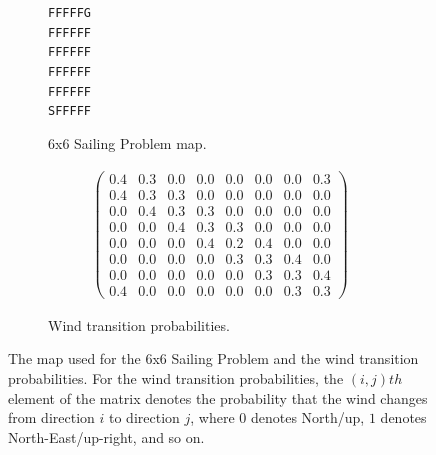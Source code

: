 \documentclass{article}
\theoremstyle{plain}
\begin{document}
\begin{appendices}
        \begin{figure}
             \centering
             \begin{subfigure}[b]{0.49\textwidth}
                 \centering
                 \texttt{FFFFFG} \\
                 \texttt{FFFFFF} \\
                 \texttt{FFFFFF} \\
                 \texttt{FFFFFF} \\
                 \texttt{FFFFFF} \\
                 \texttt{SFFFFF} 
                 \caption{6x6 Sailing Problem map.}
             \end{subfigure}
             \hfill
             \begin{subfigure}[b]{0.49\textwidth}
                 \centering
                 \begin{align*}
                     \begin{pmatrix}
                        0.4 & 0.3 & 0.0 & 0.0 & 0.0 & 0.0 & 0.0 & 0.3 \\
                        0.4 & 0.3 & 0.3 & 0.0 & 0.0 & 0.0 & 0.0 & 0.0 \\
                        0.0 & 0.4 & 0.3 & 0.3 & 0.0 & 0.0 & 0.0 & 0.0 \\
                        0.0 & 0.0 & 0.4 & 0.3 & 0.3 & 0.0 & 0.0 & 0.0 \\
                        0.0 & 0.0 & 0.0 & 0.4 & 0.2 & 0.4 & 0.0 & 0.0 \\
                        0.0 & 0.0 & 0.0 & 0.0 & 0.3 & 0.3 & 0.4 & 0.0 \\
                        0.0 & 0.0 & 0.0 & 0.0 & 0.0 & 0.3 & 0.3 & 0.4 \\
                        0.4 & 0.0 & 0.0 & 0.0 & 0.0 & 0.0 & 0.3 & 0.3 
                     \end{pmatrix}
                 \end{align*}
                 \caption{Wind transition probabilities.}
             \end{subfigure}
                \caption{The map used for the 6x6 Sailing Problem and the wind transition probabilities. For the wind transition probabilities, the $(i,j)th$ element of the matrix denotes the probability that the wind changes from direction $i$ to direction $j$, where $0$ denotes North/up, $1$ denotes North-East/up-right, and so on.}
                \label{fig:sailing_deets}
        \end{figure}



\end{appendices}
\end{document}
